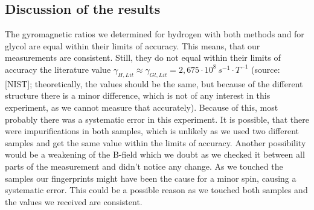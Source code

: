 \subsection{Discussion of the results}
The gyromagnetic ratios we determined for hydrogen with both methods and for glycol are equal within their limits of accuracy. This means, that our measurements are consistent. Still, they do not equal within their limits of accuracy the literature value $\gamma_{H,Lit}\approx\gamma_{Gl,Lit}=2,675\cdot10^{8} ~s^{-1}\cdot T^{-1}$ (source: [NIST]; theoretically, the values should be the same, but because of the different structure there is a minor difference, which is not of any interest in this experiment, as we cannot measure that accurately). Because of this, most probably there was a systematic error in this experiment. It is possible, that there were impurifications in both samples, which is unlikely as we used two different samples and get the same value within the limits of accuracy. Another possibility would be a weakening of the B-field which we doubt as we checked it between all parts of the measurement and didn't notice any change. As we touched the samples our fingerprints might have been the cause for a minor spin, causing a systematic error. This could be a possible reason as we touched both samples and the values we received are consistent. 